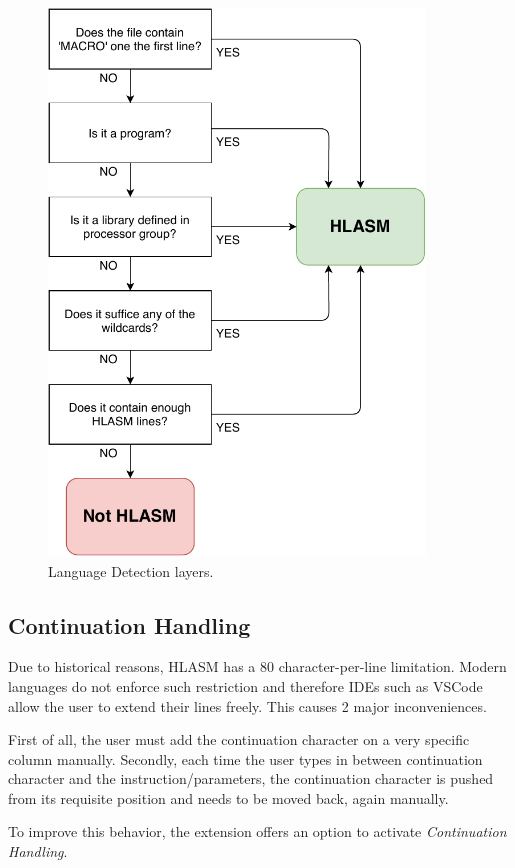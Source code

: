 \begin{figure}
	\centering
	\includegraphics[width=10cm]{img/lang_detection}
	\caption{Language Detection layers.}
	
	\label{fig08:lang}
\end{figure}

\subsection{Continuation Handling}

Due to historical reasons, HLASM has a 80 character-per-line limitation. Modern languages do not enforce such restriction and therefore IDEs such as VSCode allow the user to extend their lines freely. This causes 2 major inconveniences.

First of all, the user must add the continuation character on a very specific column manually. Secondly, each time the user types in between continuation character and the instruction/parameters, the continuation character is pushed from its requisite position and needs to be moved back, again manually.

To improve this behavior, the extension offers an option to activate \emph{Continuation Handling}. 

